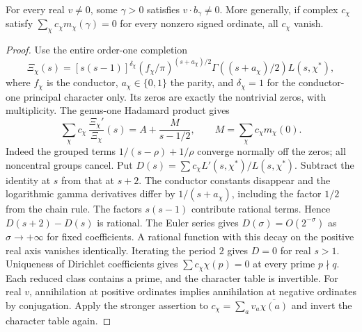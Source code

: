 \begin{lemma}\label{le:rank}
For every real \(v\ne0\), some \(\gamma>0\) satisfies \(v\cdot b_\gamma\ne0\). More generally, if complex \(c_\chi\) satisfy \(\sum_\chi c_\chi m_\chi(\gamma)=0\) for every nonzero signed ordinate, all \(c_\chi\) vanish.
\end{lemma}
\begin{proof}
Use the entire order-one completion
\[
 \Xi_\chi(s)=[s(s-1)]^{\delta_\chi}
 (f_\chi/\pi)^{(s+a_\chi)/2}\Gamma((s+a_\chi)/2)L(s,\chi^*),
\]
where \(f_\chi\) is the conductor, \(a_\chi\in\{0,1\}\) the parity, and \(\delta_\chi=1\) for the conductor-one principal character only. Its zeros are exactly the nontrivial zeros, with multiplicity. The genus-one Hadamard product gives
\[
 \sum_\chi c_\chi\,\frac{\Xi_\chi'}{\Xi_\chi}(s)= A+\frac{M}{s-1/2},
 \qquad M=\sum_\chi c_\chi m_\chi(0).
\]
Indeed the grouped terms \(1/(s-\rho)+1/\rho\) converge normally off the zeros; all noncentral groups cancel. Put \(D(s)=\sum c_\chi L'(s,\chi^*)/L(s,\chi^*)\). Subtract the identity at \(s\) from that at \(s+2\). The conductor constants disappear and the logarithmic gamma derivatives differ by \(1/(s+a_\chi)\), including the factor \(1/2\) from the chain rule. The factors \(s(s-1)\) contribute rational terms. Hence \(D(s+2)-D(s)\) is rational. The Euler series gives \(D(\sigma)=O(2^{-\sigma})\) as \(\sigma\to+\infty\) for fixed coefficients. A rational function with this decay on the positive real axis vanishes identically. Iterating the period \(2\) gives \(D=0\) for real \(s>1\). Uniqueness of Dirichlet coefficients gives \(\sum c_\chi\chi(p)=0\) at every prime \(p\nmid q\). Each reduced class contains a prime, and the character table is invertible. For real \(v\), annihilation at positive ordinates implies annihilation at negative ordinates by conjugation. Apply the stronger assertion to \(c_\chi=\sum_a v_a\overline{\chi(a)}\) and invert the character table again.
\end{proof}
